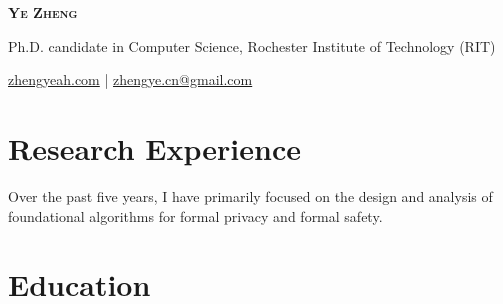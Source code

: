 \documentclass[a4paper,11pt]{article}
\newcommand{\topicon}[1]{\raisebox{0.01em}{\resizebox{!}{0.7em}{#1}}}
\newcommand{\headerfontiii}{\fontfamily{ppl}\selectfont} %
\begin{document}
\headerfontiii

\begin{center}
    {\Huge\textbf{\scshape Ye Zheng}}
\end{center}
\vspace{-2mm}

\begin{center}
  \small{Ph.D. candidate in Computer Science, Rochester Institute of Technology (RIT)}
\end{center}
\vspace{-6mm}
\begin{center}
    \small{\topicon{\faGlobe} \href{https://zhengyeah.com}{zhengyeah.com} | 
    \topicon{\faMailBulk} \href{mailto:zhengye.cn@gmail.com}{zhengye.cn@gmail.com}}
\end{center}

\section{\textbf{Research Experience}}

Over the past five years, I have primarily focused on the design and analysis of foundational algorithms for formal privacy and formal safety.

\section{\textbf{Education}}
\end{document}
